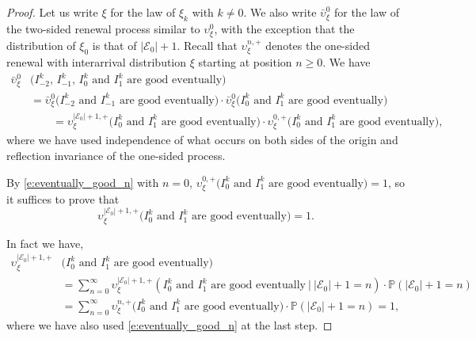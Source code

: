 \documentclass[a4paper,oneside,12pt]{amsart}
\renewcommand{\geq}{\geqslant}
\theoremstyle{plain}
\theoremstyle{definition}
\theoremstyle{remark}
\begin{document}
\begin{proof}
Let us write $\xi$ for the law of $\xi_k$ with $k\neq 0$.
We also write $\bar{\upsilon}_{\xi}^{0}$ %
for the law of the two-sided %
renewal process similar to $\upsilon_{\xi}^{0}$, %
with the exception that the distribution of $\xi_0$ is that of $|\mathcal{E}_0|+1$.
Recall that  $\upsilon_{\xi}^{n,+}$ denotes the one-sided renewal with interarrival distribution $\xi$ starting at position $n \geq 0$. We have
\begin{equation}
\label{e:good_eventually_one_sided}
\begin{split}
\bar{\upsilon}_{\xi}^{0} & \big(\text{$I^k_{-2}$, $I^k_{-1}$, $I^k_{0}$ and $I^k_1$ are good eventually} \big) \\ 
& = \bar{\upsilon}_{\xi}^{0} \big(\text{$I^k_{-2}$ and $I^k_{-1}$ are good eventually} \big) \cdot \bar{\upsilon}_{\xi}^{0} \big(\text{$I^k_{0}$ and $I^k_{1}$ are good eventually} \big) \\
&\quad \quad =  {\upsilon}_{\xi}^{|\mathcal{E}_0|+1,+} \big(\text{$I^k_{0}$ and $I^k_{1}$ are good eventually} \big) \cdot {\upsilon}_{\xi}^{0,+} \big(\text{$I^k_{0}$ and $I^k_{1}$ are good eventually} \big),
\end{split}
\end{equation}
where we have used independence of what occurs on both sides of the origin and  reflection invariance of the one-sided process.

By \eqref{e:eventually_good_n} with $n=0$, $\upsilon_{\xi}^{0,+} \big(\text{$I^k_{0}$ and $I^k_{1}$ are good eventually} \big) =1$, so it suffices to prove that 
\[
 {\upsilon}_{\xi}^{|\mathcal{E}_0|+1,+} \big(\text{$I^k_{0}$ and $I^k_{1}$ are good eventually} \big) =1.
\]

In fact we have,
\begin{equation}
\begin{split}
{\upsilon}_{\xi}^{|\mathcal{E}_0|+1,+} & \big(\text{$I^k_{0}$ and $I^k_{1}$ are good eventually} \big) \\ 
& = \sum_{n=0}^{\infty} {\upsilon}_{\xi}^{|\mathcal{E}_0|+1,+} \left(\text{$I^k_{0}$ and $I^k_{1}$ are good eventually} ~ \big\vert ~ |\mathcal{E}_0|+1 = n \right) \cdot \mathbb{P}(|\mathcal{E}_0|+1 = n) \\
& =  \sum_{n=0}^{\infty} {\upsilon}_{\xi}^{n,+} \big(\text{$I^k_{0}$ and $I^k_{1}$ are good eventually} \big) \cdot \mathbb{P}(|\mathcal{E}_0|+1 =n) = 1,
\end{split}
\end{equation}
where we have also used \eqref{e:eventually_good_n} at the last step.
\end{proof}
\end{document}
